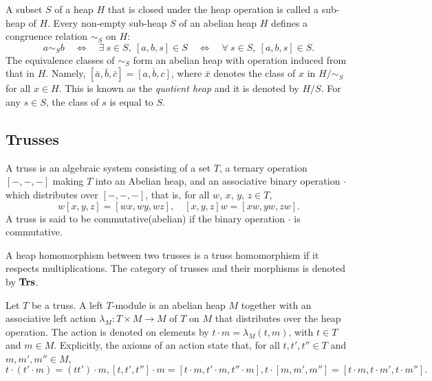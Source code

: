 \documentclass[11pt, twoside]{article}
\begin{document}
A subset $S$ of a heap $H$ that is closed under the heap operation is called a sub-heap of $H$. Every non-empty sub-heap $S$ of an abelian heap $H$ defines a congruence relation $\sim_S$ on $H$:
\begin{equation*}
a\sim_S b \quad \iff \quad \exists~s\in S,\ [a,b,s]\in S \quad \iff \quad \forall~s\in S,\ [a,b,s]\in S.
\end{equation*}
The equivalence classes of $\sim_S$ form an abelian heap with operation induced from that in $H$. Namely,
$
[\bar a, \bar b, \bar c] = \overline{[a,b,c]}
$, where $\bar x$ denotes the class of $x$ in $H/\sim_S$ for all $x\in H$. This is known as the {\em quotient heap} and it is denoted by $H/S$.
For any $s\in S$, the class of $s$ is equal to $S$.
\subsection{Trusses}

\begin{definition}{\rm \cite[Definition 3.1]{rtb}}
A truss is an algebraic system consisting of a set $T$, a ternary operation $[-,-,-]$ making $T$ into an Abelian heap, and an associative binary operation $\cdot$ which distributes over $[-,-,-]$, that is, for all $w$, $x$, $y$, $z\in T$,
\begin{equation*}
w[x,y,z]=[wx,wy,wz], \quad  [x,y,z]w=[xw,yw,zw].
\end{equation*}
A truss is said to be commutative(abelian) if the binary operation $\cdot$ is commutative.
\end{definition}
A heap homomorphism between two trusses is a truss homomorphism if it respects multiplications. The category of trusses and their morphisms is denoted by ${\rm \textbf{Trs}}$.

Let $T$ be a truss. A left $T$-module is an abelian heap $M$ together with an associative left action $\lambda_M: T\times M \longrightarrow M$ of $T$ on $M$ that distributes over the heap operation. The action is denoted on elements by $t\cdot m = \lambda_M(t,m)$, with $t\in T$ and $m\in M$. Explicitly, the axioms of an action state that, for all $t,t',t''\in T$ and $m,m',m''\in M$,
\begin{subequations}
\begin{equation*}
t\cdot(t'\cdot m) = (tt')\cdot m,
\end{equation*}
\begin{equation*}
 [t,t',t'']\cdot m = [t\cdot m,t'\cdot m,t''\cdot m] ,
\end{equation*}
\begin{equation*}
 t\cdot [m,m',m''] = [t\cdot m,t\cdot m',t\cdot m''].
\end{equation*}
\end{subequations}
\end{document}
